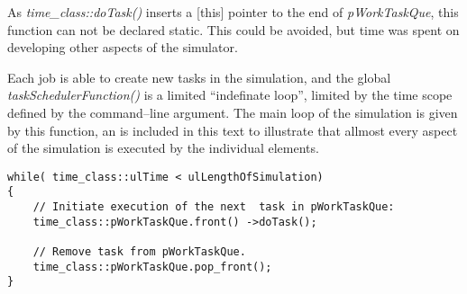	As \emph{time\_class::doTask()} inserts a [this] pointer to the end of \emph{pWorkTaskQue}, this function can not be declared static. %
	This could be avoided, but time was spent on developing other aspects of the simulator.

	Each job is able to create new tasks in the simulation, and the global \emph{taskSchedulerFunction()} is a limited ``indefinate loop'', limited by the time scope defined by the command--line argument.
	The main loop of the simulation is given by this function, an is included in this text to illustrate that allmost every aspect of the simulation is executed by the individual elements.


\begin{lstlisting}
while( time_class::ulTime < ulLengthOfSimulation)
{
	// Initiate execution of the next  task in pWorkTaskQue:
	time_class::pWorkTaskQue.front() ->doTask();

	// Remove task from pWorkTaskQue.
	time_class::pWorkTaskQue.pop_front();
}
\end{lstlisting}

